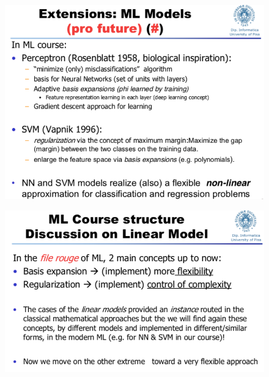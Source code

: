 \documentclass[../main.tex]{subfiles}
\begin{document}
\begin{figure}[H]
    \centering
    \includegraphics[scale = 0.5]{lectures/2_linear_model/3_slide_end1.png}
\end{figure}
\begin{figure}[H]
    \centering
    \includegraphics[scale = 0.5]{lectures/2_linear_model/3_slide_end2.png}
\end{figure}
\end{document}
